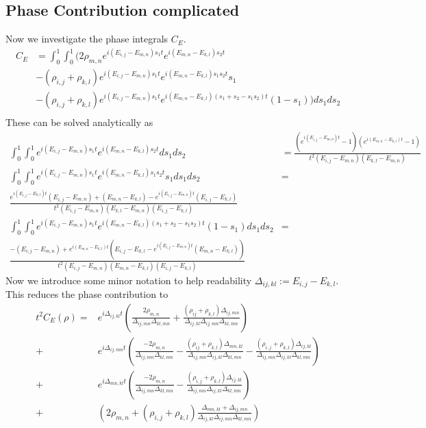 \documentclass{article}
\newcommand{\parens}[1]{\left( #1 \right)}
\begin{document}
 \subsection{Phase Contribution complicated}
 Now we investigate the phase integrals $C_E$. 
 \begin{align}
     C_E &= \int_0^1 \int_0^1 \bigg(  2 \rho_{m,n} e^{i(E_{i,j} - E_{m,n})s_1t} e^{i(E_{m,n} - E_{k,l})s_2 t}  \\
     &- (\rho_{i,j} + \rho_{k,l}) e^{i(E_{i,j} - E_{m,n})s_1 t} e^{i(E_{m,n} - E_{k,l})s_1 s_2 t} s_1 \\
     &- (\rho_{i,j} + \rho_{k,l}) e^{i(E_{i,j} - E_{m,n})s_1 t} e^{i(E_{m,n} - E_{k,l})(s_1 + s_2 - s_1 s_2)t} (1-s_1) \bigg) ds_1 ds_2 \\
 \end{align}
 These can be solved analytically as
 \begin{align}
     \int_0^1 \int_0^1 e^{i(E_{i,j} - E_{m,n})s_1t} e^{i(E_{m,n} - E_{k,l})s_2 t} ds_1 ds_2 &= \frac{(e^{i(E_{i,j} - E_{m,n})t} - 1)(e^{i(E_{m,n} - E_{k,l})t} - 1)}{t^2 (E_{i,j} - E_{m,n})(E_{k,l} - E_{m,n})} \\
     \int_0^1 \int_0^1 e^{i(E_{i,j} - E_{m,n})s_1 t} e^{i(E_{m,n} - E_{k,l})s_1 s_2 t} s_1 ds_1 ds_2 &= \nonumber \\
     \frac{e^{i(E_{i,j} - E_{k,l})t}(E_{i,j} - E_{m,n}) + (E_{m,n} - E_{k,l}) - e^{i(E_{i,j} - E_{m,n})t}(E_{i,j} - E_{k,l})}{t^2(E_{i,j} - E_{m,n})(E_{k,l} - E_{m,n})(E_{i,j} - E_{k,l})} \\
     \int_0^1 \int_0^1 e^{i(E_{i,j} - E_{m,n})s_1 t} e^{i(E_{m,n} - E_{k,l})(s_1 + s_2 - s_1 s_2)t} (1-s_1) ds_1 ds_2 &= \nonumber \\
     \frac{-(E_{i,j} - E_{m,n}) + e^{i(E_{m,n} - E_{k,l})t}\parens{E_{i,j} - E_{k,l} - e^{i(E_{i,j} - E_{m,n})t}(E_{m,n} - E_{k,l})}}{t^2 (E_{i,j} - E_{m,n})(E_{m,n} - E_{k,l})(E_{i,j} - E_{k,l})}
 \end{align}
 Now we introduce some minor notation to help readability $\Delta_{ij,kl} := E_{i,j} - E_{k,l}$. This reduces the phase contribution to
 \begin{align}
      t^2 C_E(\rho) = &e^{i\Delta_{ij,kl}t} \parens{\frac{2 \rho_{m,n}}{\Delta_{ij,mn} \Delta_{kl,mn}} + \frac{(\rho_{ij} + \rho_{k,l}) \Delta_{ij,mn}}{\Delta_{ij,kl} \Delta_{ij,mn} \Delta_{kl,mn}}} \\
     +& e^{i \Delta_{ij,mn}t} \parens{\frac{- 2 \rho_{m,n}}{\Delta_{ij,mn} \Delta_{kl,mn}} - \frac{(\rho_{ij} + \rho_{k,l}) \Delta_{mn,kl}}{\Delta_{ij,mn} \Delta_{ij,kl} \Delta_{kl,mn}} - \frac{(\rho_{i,j} + \rho_{k,l})\Delta_{ij,kl}}{\Delta_{ij,mn} \Delta_{ij,kl} \Delta_{kl,mn}}} \\
     +& e^{i \Delta_{mn,kl}t} \parens{\frac{- 2 \rho_{m,n}}{\Delta_{ij,mn} \Delta_{kl,mn}} - \frac{(\rho_{i,j} + \rho_{k,l}) \Delta_{ij,kl}}{\Delta_{ij,mn} \Delta_{ij,kl} \Delta_{kl,mn}}} \\
     +& \parens{2 \rho_{m,n} + (\rho_{i,j} + \rho_{k,l}) \frac{\Delta_{mn,kl} + \Delta_{ij,mn}}{\Delta_{ij,kl} \Delta_{ij,mn} \Delta_{kl,mn}}}
 \end{align}
 
\end{document}
